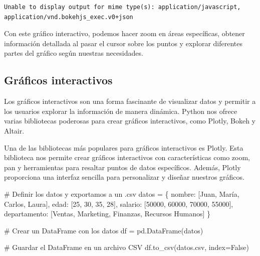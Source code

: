 \documentclass[
  a4paper,
]{article}
\newenvironment{Shaded}{}{}
\newcommand{\CommentTok}[1]{\textcolor[rgb]{0.42,0.45,0.49}{#1}}
\newcommand{\DecValTok}[1]{\textcolor[rgb]{0.00,0.36,0.77}{#1}}
\newcommand{\NormalTok}[1]{\textcolor[rgb]{0.14,0.16,0.18}{#1}}
\newcommand{\OperatorTok}[1]{\textcolor[rgb]{0.14,0.16,0.18}{#1}}
\newcommand{\StringTok}[1]{\textcolor[rgb]{0.01,0.18,0.38}{#1}}
\newcommand{\VariableTok}[1]{\textcolor[rgb]{0.89,0.38,0.04}{#1}}
\begin{document}
\begin{verbatim}
Unable to display output for mime type(s): application/javascript, application/vnd.bokehjs_exec.v0+json
\end{verbatim}

Con este gráfico interactivo, podemos hacer zoom en áreas específicas,
obtener información detallada al pasar el cursor sobre los puntos y
explorar diferentes partes del gráfico según nuestras necesidades.

\hypertarget{gruxe1ficos-interactivos-1}{%
\subsection{Gráficos interactivos}\label{gruxe1ficos-interactivos-1}}

Los gráficos interactivos son una forma fascinante de visualizar datos y
permitir a los usuarios explorar la información de manera dinámica.
Python nos ofrece varias bibliotecas poderosas para crear gráficos
interactivos, como Plotly, Bokeh y Altair.

Una de las bibliotecas más populares para gráficos interactivos es
Plotly. Esta biblioteca nos permite crear gráficos interactivos con
características como zoom, pan y herramientas para resaltar puntos de
datos específicos. Además, Plotly proporciona una interfaz sencilla para
personalizar y diseñar nuestros gráficos.

\begin{Shaded}
\begin{Highlighting}[]
\CommentTok{\# Definir los datos y exportamos a un .csv}
\NormalTok{datos }\OperatorTok{=}\NormalTok{ \{}
    \StringTok{\textquotesingle{}nombre\textquotesingle{}}\NormalTok{: [}\StringTok{\textquotesingle{}Juan\textquotesingle{}}\NormalTok{, }\StringTok{\textquotesingle{}María\textquotesingle{}}\NormalTok{, }\StringTok{\textquotesingle{}Carlos\textquotesingle{}}\NormalTok{, }\StringTok{\textquotesingle{}Laura\textquotesingle{}}\NormalTok{],}
    \StringTok{\textquotesingle{}edad\textquotesingle{}}\NormalTok{: [}\DecValTok{25}\NormalTok{, }\DecValTok{30}\NormalTok{, }\DecValTok{35}\NormalTok{, }\DecValTok{28}\NormalTok{],}
    \StringTok{\textquotesingle{}salario\textquotesingle{}}\NormalTok{: [}\DecValTok{50000}\NormalTok{, }\DecValTok{60000}\NormalTok{, }\DecValTok{70000}\NormalTok{, }\DecValTok{55000}\NormalTok{],}
    \StringTok{\textquotesingle{}departamento\textquotesingle{}}\NormalTok{: [}\StringTok{\textquotesingle{}Ventas\textquotesingle{}}\NormalTok{, }\StringTok{\textquotesingle{}Marketing\textquotesingle{}}\NormalTok{, }\StringTok{\textquotesingle{}Finanzas\textquotesingle{}}\NormalTok{, }\StringTok{\textquotesingle{}Recursos Humanos\textquotesingle{}}\NormalTok{]}
\NormalTok{\}}

\CommentTok{\# Crear un DataFrame con los datos}
\NormalTok{df }\OperatorTok{=}\NormalTok{ pd.DataFrame(datos)}

\CommentTok{\# Guardar el DataFrame en un archivo CSV}
\NormalTok{df.to\_csv(}\StringTok{\textquotesingle{}datos.csv\textquotesingle{}}\NormalTok{, index}\OperatorTok{=}\VariableTok{False}\NormalTok{)}
\end{Highlighting}
\end{Shaded}
\end{document}
